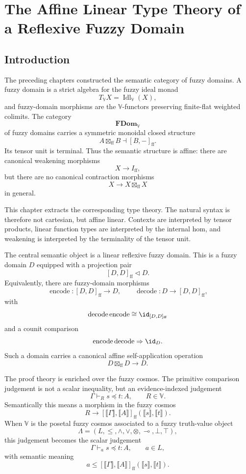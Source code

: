 \chapter{The Affine Linear Type Theory of a Reflexive Fuzzy Domain}
\label{ch:affine-linear-type-theory-reflexive-fuzzy-domain}

\section{Introduction}
\label{sec:affine-linear-type-theory-introduction}

The preceding chapters constructed the semantic category of fuzzy domains.
A fuzzy domain is a strict algebra for the fuzzy ideal monad
\[
    T_{\mathbb V}X
    =
    \operatorname{Idl}_{\mathbb V}(X),
\]
and fuzzy-domain morphisms are the \(\mathbb V\)-functors preserving
finite-flat weighted colimits.  The category
\[
    \mathbf{FDom}_{\mathbb V}
\]
of fuzzy domains carries a symmetric monoidal closed structure
\[
    A\boxtimes_{\mathrm{ff}}B
    \dashv
    [B,-]_{\mathrm{ff}}.
\]
Its tensor unit is terminal.  Thus the semantic structure is affine:
there are canonical weakening morphisms
\[
    X\longrightarrow I_{\mathrm{ff}},
\]
but there are no canonical contraction morphisms
\[
    X\longrightarrow X\boxtimes_{\mathrm{ff}}X
\]
in general.

This chapter extracts the corresponding type theory.  The natural syntax is
therefore not cartesian, but affine linear.  Contexts are interpreted by tensor
products, linear function types are interpreted by the internal hom, and
weakening is interpreted by the terminality of the tensor unit.

The central semantic object is a linear reflexive fuzzy domain.  This is a
fuzzy domain \(D\) equipped with a projection pair
\[
    [D,D]_{\mathrm{ff}}\triangleleft D.
\]
Equivalently, there are fuzzy-domain morphisms
\[
    \operatorname{encode}:[D,D]_{\mathrm{ff}}\to D,
    \qquad
    \operatorname{decode}:D\to [D,D]_{\mathrm{ff}},
\]
with
\[
    \operatorname{decode}\operatorname{encode}
    \cong
    \id_{[D,D]_{\mathrm{ff}}}
\]
and a counit comparison
\[
    \operatorname{encode}\operatorname{decode}
    \Rightarrow
    \id_D.
\]
Such a domain carries a canonical affine self-application operation
\[
    D\boxtimes_{\mathrm{ff}}D\longrightarrow D.
\]

The proof theory is enriched over the fuzzy cosmos.  The primitive comparison
judgement is not a scalar inequality, but an evidence-indexed judgement
\[
    \Gamma\vdash_R s\preceq t:A,
    \qquad
    R\in\mathbb V.
\]
Semantically this means a morphism in the fuzzy cosmos
\[
    R
    \longrightarrow
    [\llbracket \Gamma\rrbracket,
     \llbracket A\rrbracket]_{\mathrm{ff}}
    (\llbracket s\rrbracket,\llbracket t\rrbracket).
\]
When \(\mathbb V\) is the posetal fuzzy cosmos associated to a fuzzy
truth-value object
\[
    \Lambda=(L,\leq,\wedge,\vee,\otimes,\multimap,\bot,\top),
\]
this judgement becomes the scalar judgement
\[
    \Gamma\vdash_a s\preceq t:A,
    \qquad
    a\in L,
\]
with semantic meaning
\[
    a
    \leq
    [\llbracket \Gamma\rrbracket,
     \llbracket A\rrbracket]_{\mathrm{ff}}
    (\llbracket s\rrbracket,\llbracket t\rrbracket).
\]

